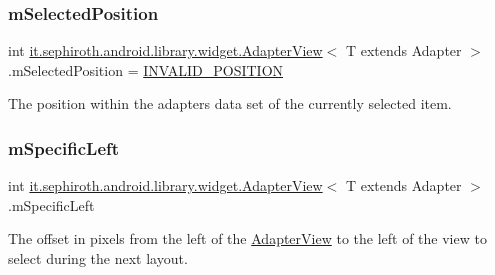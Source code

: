 \subsubsection{\texorpdfstring{m\+Selected\+Position}{mSelectedPosition}}
{\footnotesize\ttfamily int \hyperlink{classit_1_1sephiroth_1_1android_1_1library_1_1widget_1_1_adapter_view}{it.\+sephiroth.\+android.\+library.\+widget.\+Adapter\+View}$<$ T extends Adapter $>$.m\+Selected\+Position = \hyperlink{classit_1_1sephiroth_1_1android_1_1library_1_1widget_1_1_adapter_view_a2751b7d592638baeaf149f6da0d4e598}{I\+N\+V\+A\+L\+I\+D\+\_\+\+P\+O\+S\+I\+T\+I\+ON}\hspace{0.3cm}{\ttfamily [protected]}}

The position within the adapter\textquotesingle{}s data set of the currently selected item. \mbox{\label{classit_1_1sephiroth_1_1android_1_1library_1_1widget_1_1_adapter_view_a8be6a59af0527974b9a0b7b23a031d89}} 
\subsubsection{\texorpdfstring{m\+Specific\+Left}{mSpecificLeft}}
{\footnotesize\ttfamily int \hyperlink{classit_1_1sephiroth_1_1android_1_1library_1_1widget_1_1_adapter_view}{it.\+sephiroth.\+android.\+library.\+widget.\+Adapter\+View}$<$ T extends Adapter $>$.m\+Specific\+Left\hspace{0.3cm}{\ttfamily [protected]}}

The offset in pixels from the left of the \hyperlink{classit_1_1sephiroth_1_1android_1_1library_1_1widget_1_1_adapter_view}{Adapter\+View} to the left of the view to select during the next layout. \mbox{\label{classit_1_1sephiroth_1_1android_1_1library_1_1widget_1_1_adapter_view_ad6ed8500ebbb7de0ac7a452385ffccb4}} 
